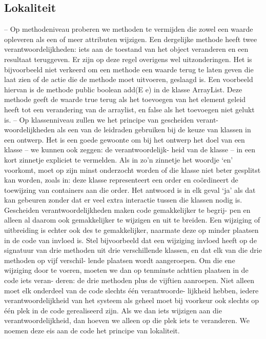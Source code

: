 \documentclass{article}
\begin{document}
	\subsection{Lokaliteit}
	
	– Op methodeniveau proberen we methoden te vermijden die zowel
	een waarde opleveren als een of meer attributen wijzigen. Een dergelijke
	methode heeft twee verantwoordelijkheden: iets aan de toestand van het
	object veranderen en een resultaat teruggeven.
	Er zijn op deze regel overigens wel uitzonderingen. Het is bijvoorbeeld
	niet verkeerd om een methode een waarde terug te laten geven die laat
	zien of de actie die de methode moet uitvoeren, geslaagd is. Een voorbeeld hiervan is de methode
	public boolean add(E e)
	in de klasse ArrayList. Deze methode geeft de waarde true terug als
	het toevoegen van het element geleid heeft tot een verandering van de
	arraylist, en false als het toevoegen niet gelukt is.
	– Op klassenniveau zullen we het principe van gescheiden verant-
	woordelijkheden als een van de leidraden gebruiken bij de keuze van
	klassen in een ontwerp. Het is een goede gewoonte om bij het ontwerp
	het doel van een klasse – we kunnen ook zeggen: de verantwoordelijk-
	heid van de klasse – in een kort zinnetje expliciet te vermelden.
	Als in zo’n zinnetje het woordje ‘en’ voorkomt, moet op zijn minst
	onderzocht worden of die klasse niet beter gesplitst kan worden, zoals
	in: deze klasse representeert een order en coördineert de toewijzing van
	containers aan die order. Het antwoord is in elk geval ‘ja’ als dat kan
	gebeuren zonder dat er veel extra interactie tussen die klassen nodig is.
	Gescheiden verantwoordelijkheden maken code gemakkelijker te begrij-
	pen en alleen al daarom ook gemakkelijker te wijzigen en uit te breiden.
	Een wijziging of uitbreiding is echter ook des te gemakkelijker, naarmate
	deze op minder plaatsen in de code van invloed is. Stel bijvoorbeeld dat
	een wijziging invloed heeft op de signatuur van drie methoden uit drie
	verschillende klassen, en dat elk van die drie methoden op vijf verschil-
	lende plaatsen wordt aangeroepen. Om die ene wijziging door te voeren,
	moeten we dan op tenminste achttien plaatsen in de code iets veran-
	deren: de drie methoden plus de vijftien aanroepen.
	Niet alleen moet elk onderdeel van de code slechts één verantwoorde-
	lijkheid hebben, iedere verantwoordelijkheid van het systeem als geheel
	moet bij voorkeur ook slechts op één plek in de code gerealiseerd zijn.
	Als we dan iets wijzigen aan die verantwoordelijkheid, dan hoeven we
	alleen op die plek iets te veranderen. We noemen deze eis aan de code
	het principe van lokaliteit.
	
\end{document}
